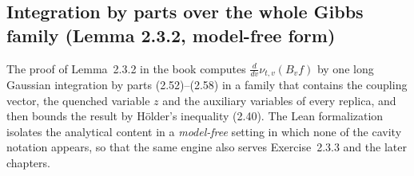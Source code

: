 \subsection{Integration by parts over the whole Gibbs family (Lemma 2.3.2, model-free form)}\label{sub:sg-tal:perceptron-model-free-ibp}

The proof of Lemma~2.3.2 in the book computes $\frac{d}{dv}\nu_{t,v}(B_vf)$ by one long Gaussian integration by parts (2.52)--(2.58) in a family
that contains the coupling vector, the quenched variable $z$ and the auxiliary variables of every replica, and then bounds the result by H\"older's inequality (2.40).
The Lean formalization isolates the analytical content in a \emph{model-free} setting in which none of the cavity notation appears, so that the same engine also serves
Exercise~2.3.3 and the later chapters.

